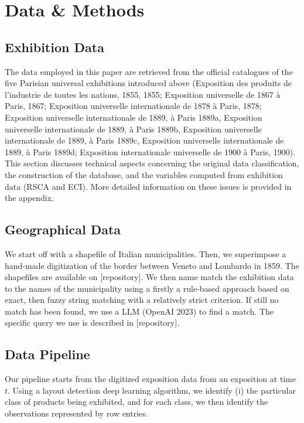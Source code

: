 \section{Data \& Methods}

\subsection{Exhibition Data} 
The data employed in this paper are retrieved from the official catalogues of the five Parisian universal exhibitions introduced above (Exposition des produits de l’industrie de toutes les nations, 1855, 1855; Exposition universelle de 1867 à Paris, 1867; Exposition universelle internationale de 1878 à Paris, 1878; Exposition universelle internationale de 1889, à Paris 1889a, Exposition universelle internationale de 1889, à Paris 1889b, Exposition universelle internationale de 1889, à Paris 1889c, Exposition universelle internationale de 1889, à Paris 1889d; Exposition internationale universelle de 1900 à Paris, 1900). This section discusses technical aspects concerning the original data classification, the construction of the database, and the variables computed from exhibition data (RSCA and ECI). More detailed information on these issues is provided in the appendix.

\subsection{Geographical Data}

We start off with a shapefile of Italian municipalities. Then, we superimpose a hand-made digitization of the border between Veneto and Lombardo in 1859. The shapefiles are available on [repository]. We then name match the exhibition data to the names of the municipality using a firstly a rule-based approach based on exact, then fuzzy string matching with a relatively strict criterion. If still no match has been found, we use a LLM (OpenAI 2023) to find a match. The specific query we use is described in [repository]. 

\subsection{Data Pipeline}



Our pipeline starts from the digitized exposition data from an exposition at time $t$. Using a layout detection deep learning algorithm, we identify (i) the particular class of products being exhibited, and for each class, we then identify the observations represented by row entries. 

